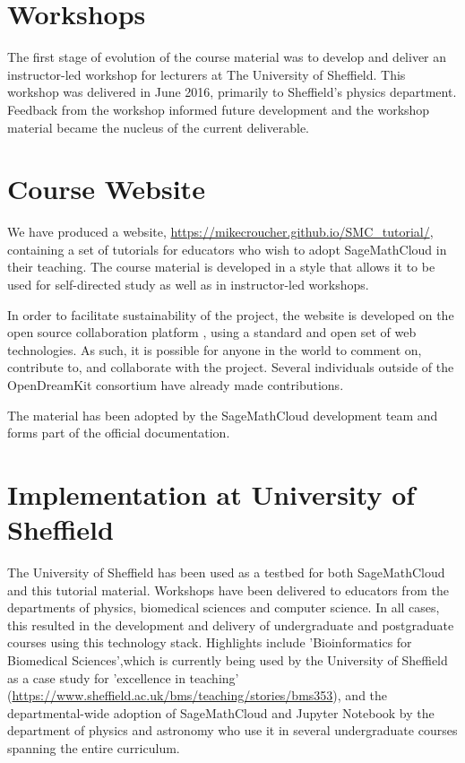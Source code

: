 \documentclass{deliverablereport}
\author{Mike Croucher and Tania Allard}
\begin{document}
\maketitle
\strut\githubissuedescription
\tableofcontents\newpage
\section{Workshops}
The first stage of evolution of the course material was to develop and deliver an instructor-led workshop for lecturers at The University of Sheffield.
This workshop was delivered in June 2016, primarily to Sheffield's physics department. Feedback from the workshop informed future development and the workshop material became the nucleus of the current deliverable.
\section{Course Website}
We have produced a website, \url{https://mikecroucher.github.io/SMC_tutorial/}, containing a set of tutorials for educators who wish to adopt SageMathCloud in their teaching. The course material is developed in a style that allows it to be used for self-directed study as well as in instructor-led workshops.

In order to facilitate sustainability of the project, the website is
developed on the open source collaboration platform \GitHub, using a standard and open set of web technologies. As such, it is possible for anyone in the world to comment on, contribute to, and collaborate with the project.
Several individuals outside of the OpenDreamKit consortium have already made contributions.

The material has been adopted by the SageMathCloud development team and forms part of the official documentation.
\section{Implementation at University of Sheffield}
The University of Sheffield has been used as a testbed for both SageMathCloud and this tutorial material. Workshops have been delivered to educators from the departments of physics, biomedical sciences and computer science. In all cases, this resulted in the development and delivery of undergraduate and postgraduate courses using this technology stack. Highlights include 'Bioinformatics for Biomedical Sciences',which is currently being used by the University of Sheffield as a case study for 'excellence in teaching' (\url{https://www.sheffield.ac.uk/bms/teaching/stories/bms353}), and the departmental-wide adoption of SageMathCloud and Jupyter Notebook by the department of physics and astronomy who use it in several undergraduate courses spanning the entire curriculum.
\end{document}
